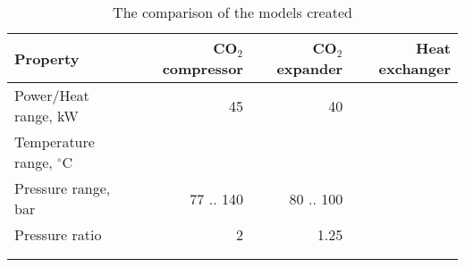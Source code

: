 \begin{table}
\label{tab:DiscussionComparison}
\caption{The comparison of the models created}
\begin{center}
\begin{tabulary}{0.9\textwidth}{LRRR}
\toprule
Property    	                &	CO$_2$ compressor   & CO$_2$	expander    & Heat exchanger    \\
\midrule
Power/Heat range, kW            &       45              &       40              &                   \\
Temperature range, $^\circ$C    &                       &                       &                   \\
Pressure range, bar             &   77 .. 140           &     80 .. 100         &                   \\
Pressure ratio                  &   2                   &        1.25           &                   \\
& & & \\
& & & \\
\bottomrule
\end{tabulary}
\end{center}
\end{table}